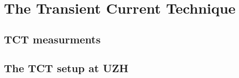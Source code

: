 \chapter{The Transient Current Technique}
\label{chap1}

\section{TCT measurments}

\section{The TCT setup at UZH}

